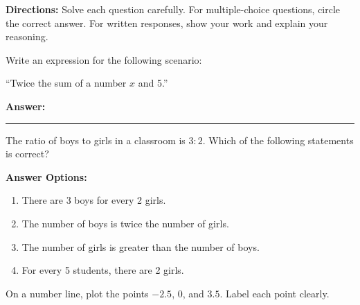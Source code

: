 \documentclass[12pt]{article}
\begin{document}

\begin{tcolorbox}[colframe=black!50, colback=white, title=Assessment Directions]
\textbf{Directions:} Solve each question carefully. For multiple-choice questions, circle the correct answer. For written responses, show your work and explain your reasoning.
\end{tcolorbox}

\begin{tcolorbox}[colframe=black!50, colback=white, title=\textbf{Problem 1}]
Write an expression for the following scenario: 

``Twice the sum of a number \(x\) and 5.'' 

\vspace{2cm}
\textbf{Answer:} \rule{0.5\textwidth}{0.4mm}
\end{tcolorbox}

\begin{tcolorbox}[colframe=black!50, colback=white, title=\textbf{Problem 2}]
The ratio of boys to girls in a classroom is \(3:2\). Which of the following statements is correct?

\textbf{Answer Options:}
\begin{enumerate}[label=(\Alph*), itemsep=0.5cm]
    \item There are 3 boys for every 2 girls.
    \item The number of boys is twice the number of girls.
    \item The number of girls is greater than the number of boys.
    \item For every 5 students, there are 2 girls.
\end{enumerate}
\vspace{1cm}
\end{tcolorbox}

\begin{tcolorbox}[colframe=black!50, colback=white, title=\textbf{Problem 3}]
On a number line, plot the points \(-2.5\), \(0\), and \(3.5\). Label each point clearly.

\begin{center}
\end{center}
\vspace{1cm}
\end{tcolorbox}
\end{document}
